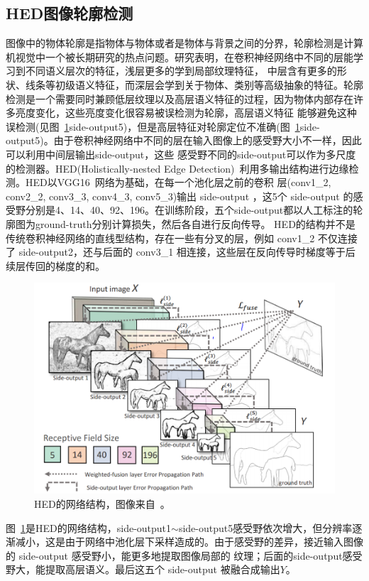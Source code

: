 \documentclass[UTF8]{ctexart}
\numberwithin{equation}{section} %
\numberwithin{table}{section} %
\begin{document}
\subsection{HED图像轮廓检测}
图像中的物体轮廓是指物体与物体或者是物体与背景之间的分界，轮廓检测是计算机视觉中一个被长期研究的热点问题。研究表明，在卷积神经网络中不同的层能学习到不同语义层次的特征，浅层更多的学到局部纹理特征，
中层含有更多的形状、线条等初级语义特征，而深层会学到关于物体、类别等高级抽象的特征。轮廓检测是一个需要同时兼顾低层纹理以及高层语义特征的过程，因为物体内部存在许多亮度变化，这些亮度变化很容易被误检测为轮廓，高层语义特征
能够避免这种误检测(见图~\ref{fig:hed_arch}side-output5)，但是高层特征对轮廓定位不准确(图~\ref{fig:hed_arch}side-output5)。由于卷积神经网络中不同的层在输入图像上的感受野大小不一样，因此可以利用中间层输出side-output，这些
感受野不同的side-output可以作为多尺度的检测器。HED(Holistically-nested Edge Detection)~\cite{xie2015holistically}利用多输出结构进行边缘检测。HED以VGG16~\cite{Simonyan14c}网络为基础，在每一个池化层之前的卷积
层(conv1\_2, conv2\_2, conv3\_3, conv4\_3, conv5\_3)输出 side-output ，这5个 side-output 的感受野分别是4、14、40、92、196。在训练阶段，五个side-output都以人工标注的轮廓图为ground-truth分别计算损失，然后各自进行反向传导。
HED的结构并不是传统卷积神经网络的直线型结构，存在一些有分叉的层，例如 conv1\_2 不仅连接了 side-output2，还与后面的 conv3\_1 相连接，这些层在反向传导时梯度等于后续层传回的梯度的和。
\begin{figure}[!htb]
\centering
\includegraphics[scale=0.35]{figures/hed_arch.png}
\caption{HED的网络结构，图像来自~\cite{xie2015holistically}。
}
\label{fig:hed_arch}
\end{figure}
图~\ref{fig:hed_arch}是HED的网络结构，side-output1$\sim$side-output5感受野依次增大，但分辨率逐渐减小，这是由于网络中池化层下采样造成的。由于感受野的差异，接近输入图像的 side-output 感受野小，能更多地提取图像局部的
纹理；后面的side-output感受野大，能提取高层语义。最后这五个 side-output 被融合成输出$Y$。
\end{document}
